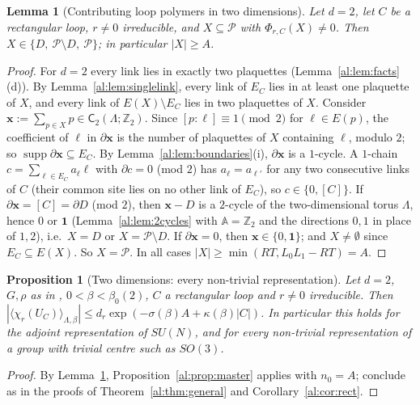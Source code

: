 \documentclass[11pt,a4paper]{article}
\newtheorem{lemma}[theorem]{Lemma}
\newtheorem{proposition}[theorem]{Proposition}
\theoremstyle{definition}
\theoremstyle{remark}
\DeclareMathOperator{\supp}{supp}
\newcommand{\Z}{\mathbb{Z}}
\newcommand{\cP}{\mathcal{P}}
\newcommand{\sC}{\mathsf{C}}
\newcommand{\bA}{\mathbb{A}}
\newcommand{\Fname}[2]{\cite[#1~`#2']{F}}
\begin{document}
\begin{lemma}[Contributing loop polymers in two dimensions]\label{al:lem:2dsupport}
Let $d=2$, let $C$ be a rectangular loop, $r\neq0$ irreducible, and $X\subseteq\cP$ with $\Phi_{r,C}(X)\neq0$. Then
$X\in\{D,\ \cP\setminus D,\ \cP\}$; in particular $|X|\ge A$.
\end{lemma}

\begin{proof}
For $d=2$ every link lies in exactly two plaquettes (Lemma~\ref{al:lem:facts}(d)). By Lemma~\ref{al:lem:singlelink}, every
link of $E_C$ lies in at least one plaquette of $X$, and every link of $E(X)\setminus E_C$ lies in two plaquettes of $X$.
Consider $\mathbf x:=\sum_{p\in X}p\in\sC_2(\Lambda;\Z_2)$. Since $[p:\ell]\equiv1\pmod 2$ for $\ell\in E(p)$, the coefficient
of $\ell$ in $\partial\mathbf x$ is the number of plaquettes of $X$ containing $\ell$, modulo $2$; so
$\supp\partial\mathbf x\subseteq E_C$. By Lemma~\ref{al:lem:boundaries}(i), $\partial\mathbf x$ is a $1$-cycle. A $1$-chain
$c=\sum_{\ell\in E_C}a_\ell\ell$ with $\partial c=0$ (mod $2$) has $a_\ell=a_{\ell'}$ for any two consecutive links of $C$ (their
common site lies on no other link of $E_C$), so $c\in\{0,[C]\}$. If $\partial\mathbf x=[C]=\partial D$ (mod $2$), then $\mathbf x-D$ is a
$2$-cycle of the two-dimensional torus $\Lambda$, hence $0$ or $\mathbf 1$ (Lemma~\ref{al:lem:2cycles} with $\bA=\Z_2$ and
the directions $0,1$ in place of $1,2$), i.e.\ $X=D$ or $X=\cP\setminus D$. If $\partial\mathbf x=0$, then $\mathbf x\in\{0,\mathbf 1\}$; and $X\neq\emptyset$ since $E_C\subseteq E(X)$.
So $X=\cP$. In all cases $|X|\ge\min(RT,L_0L_1-RT)=A$.
\end{proof}

\begin{proposition}[Two dimensions: every non-trivial representation]\label{al:prop:2d}
Let $d=2$, $G,\rho$ as in \Fname{Convention}{Group}, $0<\beta<\beta_0(2)$, $C$ a rectangular loop and $r\neq0$ irreducible.
Then $|\langle\chi_r(U_C)\rangle_{\Lambda,\beta}|\le d_r\exp(-\sigma(\beta)A+\kappa(\beta)|C|)$. In particular this holds for
the adjoint representation of $SU(N)$, and for every non-trivial representation of a group with trivial centre such as
$SO(3)$.
\end{proposition}

\begin{proof}
By Lemma~\ref{al:lem:2dsupport}, Proposition~\ref{al:prop:master} applies with $n_0=A$; conclude as in the proofs of
Theorem~\ref{al:thm:general} and Corollary~\ref{al:cor:rect}.
\end{proof}
\end{document}
